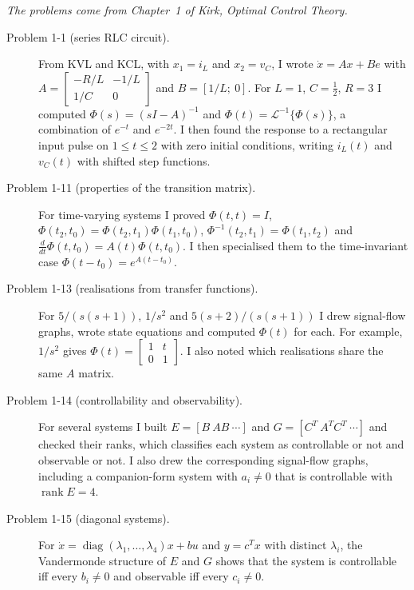 


\noindent\textit{The problems come from Chapter~1 of Kirk, \emph{Optimal Control Theory}.}

\begin{description}
  \item[Problem 1-1 (series RLC circuit).] From KVL and KCL, with $x_1=i_L$ and $x_2=v_C$, I wrote $\dot x = Ax + Be$ with $A=\begin{bmatrix}-R/L & -1/L\\ 1/C & 0\end{bmatrix}$ and $B=[1/L;\ 0]$. For $L=1$, $C=\tfrac12$, $R=3$ I computed $\Phi(s)=(sI-A)^{-1}$ and $\Phi(t)=\mathcal{L}^{-1}\{\Phi(s)\}$, a combination of $e^{-t}$ and $e^{-2t}$. I then found the response to a rectangular input pulse on $1\le t\le 2$ with zero initial conditions, writing $i_L(t)$ and $v_C(t)$ with shifted step functions.
  \item[Problem 1-11 (properties of the transition matrix).] For time-varying systems I proved $\Phi(t,t)=I$, $\Phi(t_2,t_0)=\Phi(t_2,t_1)\Phi(t_1,t_0)$, $\Phi^{-1}(t_2,t_1)=\Phi(t_1,t_2)$ and $\tfrac{d}{dt}\Phi(t,t_0)=A(t)\Phi(t,t_0)$. I then specialised them to the time-invariant case $\Phi(t-t_0)=e^{A(t-t_0)}$.
  \item[Problem 1-13 (realisations from transfer functions).] For $5/(s(s+1))$, $1/s^2$ and $5(s+2)/(s(s+1))$ I drew signal-flow graphs, wrote state equations and computed $\Phi(t)$ for each. For example, $1/s^2$ gives $\Phi(t)=\begin{bmatrix}1&t\\0&1\end{bmatrix}$. I also noted which realisations share the same $A$ matrix.
  \item[Problem 1-14 (controllability and observability).] For several systems I built $E=[B\ AB\ \cdots]$ and $G=[C^T\ A^TC^T\ \cdots]$ and checked their ranks, which classifies each system as controllable or not and observable or not. I also drew the corresponding signal-flow graphs, including a companion-form system with $a_i\neq 0$ that is controllable with $\operatorname{rank}E=4$.
  \item[Problem 1-15 (diagonal systems).] For $\dot x=\operatorname{diag}(\lambda_1,\dots,\lambda_4)x+bu$ and $y=c^Tx$ with distinct $\lambda_i$, the Vandermonde structure of $E$ and $G$ shows that the system is controllable iff every $b_i\neq 0$ and observable iff every $c_i\neq 0$.
\end{description}

